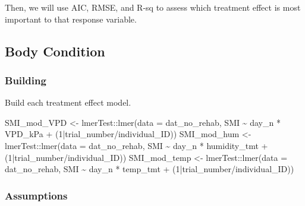 \documentclass[
]{article}
\newenvironment{Shaded}{\begin{snugshade}}{\end{snugshade}}
\newcommand{\AttributeTok}[1]{\textcolor[rgb]{0.77,0.63,0.00}{#1}}
\newcommand{\DecValTok}[1]{\textcolor[rgb]{0.00,0.00,0.81}{#1}}
\newcommand{\FunctionTok}[1]{\textcolor[rgb]{0.00,0.00,0.00}{#1}}
\newcommand{\NormalTok}[1]{#1}
\newcommand{\OtherTok}[1]{\textcolor[rgb]{0.56,0.35,0.01}{#1}}
\newcommand{\SpecialCharTok}[1]{\textcolor[rgb]{0.00,0.00,0.00}{#1}}
\begin{document}
Then, we will use AIC, RMSE, and R-sq to assess which treatment effect
is most important to that response variable.

\hypertarget{body-condition}{%
\subsection{Body Condition}\label{body-condition}}

\hypertarget{building}{%
\subsubsection{Building}\label{building}}

Build each treatment effect model.

\begin{Shaded}
\begin{Highlighting}[]
\NormalTok{SMI\_mod\_VPD }\OtherTok{\textless{}{-}}\NormalTok{ lmerTest}\SpecialCharTok{::}\FunctionTok{lmer}\NormalTok{(}\AttributeTok{data =}\NormalTok{ dat\_no\_rehab,}
\NormalTok{                              SMI }\SpecialCharTok{\textasciitilde{}}\NormalTok{ day\_n }\SpecialCharTok{*}\NormalTok{ VPD\_kPa }\SpecialCharTok{+}
\NormalTok{                              (}\DecValTok{1}\SpecialCharTok{|}\NormalTok{trial\_number}\SpecialCharTok{/}\NormalTok{individual\_ID))}
\NormalTok{SMI\_mod\_hum }\OtherTok{\textless{}{-}}\NormalTok{ lmerTest}\SpecialCharTok{::}\FunctionTok{lmer}\NormalTok{(}\AttributeTok{data =}\NormalTok{ dat\_no\_rehab,}
\NormalTok{                              SMI }\SpecialCharTok{\textasciitilde{}}\NormalTok{ day\_n }\SpecialCharTok{*}\NormalTok{ humidity\_tmt }\SpecialCharTok{+}
\NormalTok{                              (}\DecValTok{1}\SpecialCharTok{|}\NormalTok{trial\_number}\SpecialCharTok{/}\NormalTok{individual\_ID))}
\NormalTok{SMI\_mod\_temp }\OtherTok{\textless{}{-}}\NormalTok{ lmerTest}\SpecialCharTok{::}\FunctionTok{lmer}\NormalTok{(}\AttributeTok{data =}\NormalTok{ dat\_no\_rehab,}
\NormalTok{                              SMI }\SpecialCharTok{\textasciitilde{}}\NormalTok{ day\_n }\SpecialCharTok{*}\NormalTok{ temp\_tmt }\SpecialCharTok{+}
\NormalTok{                              (}\DecValTok{1}\SpecialCharTok{|}\NormalTok{trial\_number}\SpecialCharTok{/}\NormalTok{individual\_ID))}
\end{Highlighting}
\end{Shaded}

\hypertarget{assumptions}{%
\subsubsection{Assumptions}\label{assumptions}}
\end{document}
